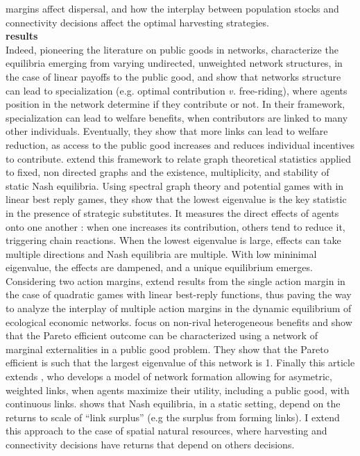 \documentclass{article}
\begin{document}
margins affect dispersal, and how the interplay between population stocks and connectivity decisions affect the optimal harvesting strategies.\\
\textbf{results}\\

Indeed, pioneering the literature on public goods in networks, \cite{bramoulle_public_2007} characterize the equilibria emerging from varying undirected, unweighted network structures, in the case of linear payoffs to the public good, and show that networks structure can lead to specialization (e.g. optimal contribution \textit{v.} free-riding), where agents position in the network determine if they contribute or not. In their framework, specialization can lead to welfare benefits, when contributors are linked to many other individuals. Eventually, they show that more links can lead to welfare reduction, as access to the public good increases and reduces individual incentives to contribute. \cite{bramoulle_strategic_2014} extend this framework to relate graph theoretical statistics applied to fixed, non directed graphs and the existence, multiplicity, and stability of static Nash equilibria. Using spectral graph theory and potential games with in linear best reply games, they show that the lowest eigenvalue is the key statistic in the presence of strategic substitutes. It measures the direct effects of agents onto one another : when one increases its contribution, others tend to reduce it, triggering chain reactions. When the lowest eigenvalue is large, effects can take multiple directions and Nash equilibria are multiple. With low mininimal eigenvalue, the effects are dampened, and a unique equilibrium emerges. Considering two action margins, \cite{chen_multiple_2018} extend results from the single action margin in the case of quadratic games with linear best-reply functions, thus paving the way to analyze the interplay of multiple action margins in the dynamic equilibrium of ecological economic networks. \cite{elliott_network_2019} focus on non-rival heterogeneous benefits and show that the Pareto efficient outcome can be characterized using a network of marginal externalities in a public good problem. They show that the Pareto efficient is such that the largest eigenvalue of this network is 1. Finally this article extends \cite{griffith_continuous_2022}, who develops a model of network formation allowing for asymetric, weighted links, when agents maximize their utility, including a public good, with continuous links. \cite{griffith_continuous_2022} shows that Nash equilibria, in a static setting, depend on the returns to scale of \enquote{link surplus} (e.g the surplus from forming links). I extend this approach to the case of spatial natural resources, where harvesting and connectivity decisions have returns that depend on others decisions. 
\end{document}
